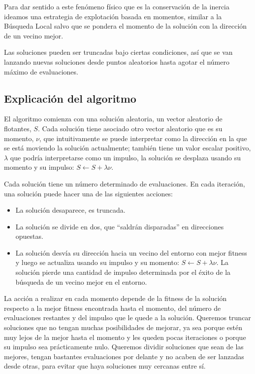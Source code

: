 \documentclass{article}
\begin{document}
Para dar sentido a este fenómeno físico que es la conservación de la inercia ideamos una estrategia de explotación basada en momentos, similar
a la Búsqueda Local salvo que se pondera el momento de la solución con la dirección de un vecino mejor.

Las soluciones pueden ser truncadas bajo ciertas
condiciones, así que se van lanzando nuevas soluciones desde puntos aleatorios hasta agotar el número máximo de evaluaciones.

\subsection{Explicación del algoritmo}

El algoritmo comienza con una solución aleatoria, un vector aleatorio de flotantes, $S$. Cada solución tiene asociado otro vector aleatorio que es
su momento, $\nu$, que intuitivamente se puede interpretar como la dirección en la que se está moviendo la solución actualmente; también tiene un
valor escalar positivo, $\lambda$ que podría interpretarse como un impulso, la solución se desplaza usando su momento y su impulso:
$S\gets S+\lambda\nu$.

Cada solución tiene un número determinado de evaluaciones. En cada iteración, una solución puede hacer una de las siguientes acciones:
\begin{itemize}
	\item La solución desaparece, es truncada.
	\item La solución se divide en dos, que ``saldrán disparadas'' en direcciones opuestas.
	\item La solución desvía su dirección hacia un vecino del entorno con mejor fitness y luego se actualiza usando su impulso y su momento: $S\gets S+\lambda\nu$. La solución pierde una cantidad de impulso determinada por el éxito de la búsqueda de un vecino mejor en el entorno.
\end{itemize}
La acción a realizar en cada momento depende de la fitness de la solución respecto a la mejor fitness encontrada hasta el momento, del número de evaluaciones restantes y del impulso que le quede a la solución. Queremos truncar soluciones que no tengan muchas posibilidades de mejorar, ya sea porque
estén muy lejos de la mejor hasta el momento y les queden pocas iteraciones o porque su impulso sea prácticamente nulo. Queremos dividir soluciones
que sean de las mejores, tengan bastantes evaluaciones por delante y no acaben de ser lanzadas desde otras, para evitar que haya soluciones muy
cercanas entre sí.
\end{document}
